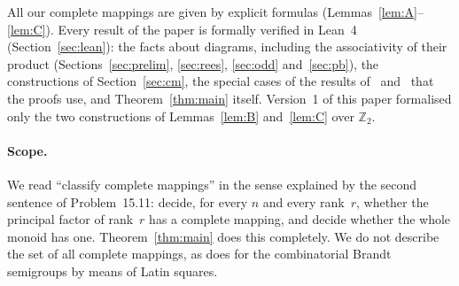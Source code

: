 \documentclass[11pt]{article}
\theoremstyle{remark}
\newcommand{\Z}{\mathbb Z}
\begin{document}
All our complete mappings are given by explicit formulas
(Lemmas~\ref{lem:A}--\ref{lem:C}). Every result of the paper is formally
verified in Lean~4 (Section~\ref{sec:lean}): the facts about diagrams,
including the associativity of their product (Sections~\ref{sec:prelim},
\ref{sec:rees}, \ref{sec:odd} and~\ref{sec:pb}),
the constructions of Section~\ref{sec:cm}, the special cases of the results
of~\cite{abchk} and~\cite{emrt} that the proofs use, and
Theorem~\ref{thm:main} itself. Version~1 of this paper formalised only the two
constructions of Lemmas~\ref{lem:B} and~\ref{lem:C} over $\Z_2$.

\paragraph{Scope.}
We read ``classify complete mappings'' in the sense explained by the second
sentence of Problem~15.11: decide, for every $n$ and every rank~$r$, whether the
principal factor of rank~$r$ has a complete mapping, and decide whether the
whole monoid has one. Theorem~\ref{thm:main} does this completely. We do not
describe the set of all complete mappings, as \cite[Proposition~6.5]{abchk}
does for the combinatorial Brandt semigroups by means of Latin squares.
\end{document}
